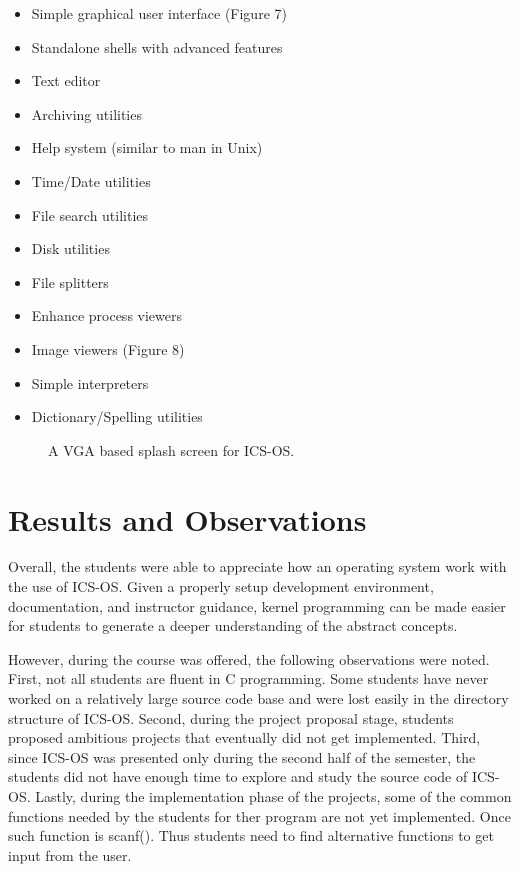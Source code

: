 \documentclass{acm_proc_article-sp}
\begin{document}
\begin{itemize}
\item{Simple graphical user interface (Figure 7)}
\item{Standalone shells with advanced features}
\item{Text editor}
\item{Archiving utilities}
\item{Help system (similar to man in Unix)}
\item{Time/Date utilities}
\item{File search utilities}
\item{Disk utilities}
\item{File splitters}
\item{Enhance process viewers}
\item{Image viewers (Figure 8)}
\item{Simple interpreters}
\item{Dictionary/Spelling utilities}
\end{itemize}

\begin{figure}
\centering
{}
\caption{A VGA based splash screen for ICS-OS.}
\end{figure}



\section{Results and Observations}
Overall, the students were able to appreciate how an operating system work
with the use of ICS-OS. Given a properly setup development environment, 
documentation, and instructor guidance, kernel programming can be made easier
for students to generate a deeper understanding of the abstract concepts. 

However, during the course was offered, the following observations were noted.
First, not all students are fluent in C programming. Some students have never
worked on a relatively large source code base and were lost easily in the 
directory structure of ICS-OS. Second, during the project proposal stage,
students proposed ambitious projects that eventually did not get implemented.
Third, since ICS-OS was presented only during the second half of the semester,
the students did not have enough time to explore and study the source code of
ICS-OS. Lastly, during the implementation phase of the projects, some of the 
common functions needed by the students for ther program are not yet
implemented. Once such function is scanf(). Thus students need to find
alternative functions to get input from the user.
\end{document}
